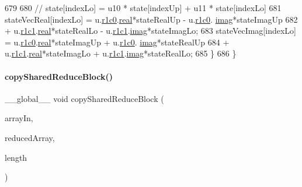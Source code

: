 \begin{DoxyCode}
679 
680         \textcolor{comment}{// state[indexLo] = u10  * state[indexUp] + u11 * state[indexLo]}
681         stateVecReal[indexLo] = u.\mbox{\hyperlink{structComplexMatrix2_ab98282015ed2065e53fbc9638e2583ab}{r1c0}}.\mbox{\hyperlink{structComplex_a479ad939835457595fcca3ca55c06283}{real}}*stateRealUp  - u.\mbox{\hyperlink{structComplexMatrix2_ab98282015ed2065e53fbc9638e2583ab}{r1c0}}.
      \mbox{\hyperlink{structComplex_a1151948284b21c0052f203f23ab931d9}{imag}}*stateImagUp 
682             + u.\mbox{\hyperlink{structComplexMatrix2_a763007c3070802373549ba0350f83c8a}{r1c1}}.\mbox{\hyperlink{structComplex_a479ad939835457595fcca3ca55c06283}{real}}*stateRealLo  -  u.\mbox{\hyperlink{structComplexMatrix2_a763007c3070802373549ba0350f83c8a}{r1c1}}.\mbox{\hyperlink{structComplex_a1151948284b21c0052f203f23ab931d9}{imag}}*stateImagLo;
683         stateVecImag[indexLo] = u.\mbox{\hyperlink{structComplexMatrix2_ab98282015ed2065e53fbc9638e2583ab}{r1c0}}.\mbox{\hyperlink{structComplex_a479ad939835457595fcca3ca55c06283}{real}}*stateImagUp + u.\mbox{\hyperlink{structComplexMatrix2_ab98282015ed2065e53fbc9638e2583ab}{r1c0}}.
      \mbox{\hyperlink{structComplex_a1151948284b21c0052f203f23ab931d9}{imag}}*stateRealUp 
684             + u.\mbox{\hyperlink{structComplexMatrix2_a763007c3070802373549ba0350f83c8a}{r1c1}}.\mbox{\hyperlink{structComplex_a479ad939835457595fcca3ca55c06283}{real}}*stateImagLo + u.\mbox{\hyperlink{structComplexMatrix2_a763007c3070802373549ba0350f83c8a}{r1c1}}.\mbox{\hyperlink{structComplex_a1151948284b21c0052f203f23ab931d9}{imag}}*stateRealLo;
685     \}
686 \}
\end{DoxyCode}
\mbox{\label{QuEST__env__localGPU_8cu_a250e9d66ad94ed2682e76a3c7502c8e1}} 
\paragraph{\texorpdfstring{copy\+Shared\+Reduce\+Block()}{copySharedReduceBlock()}}
{\footnotesize\ttfamily \+\_\+\+\_\+global\+\_\+\+\_\+ void copy\+Shared\+Reduce\+Block (\begin{DoxyParamCaption}\item[{\mbox{\hyperlink{QuEST__precision_8h_a4b654506f18b8bfd61ad2a29a7e38c25}{R\+E\+AL}} $\ast$}]{array\+In,  }\item[{\mbox{\hyperlink{QuEST__precision_8h_a4b654506f18b8bfd61ad2a29a7e38c25}{R\+E\+AL}} $\ast$}]{reduced\+Array,  }\item[{int}]{length }\end{DoxyParamCaption})}




